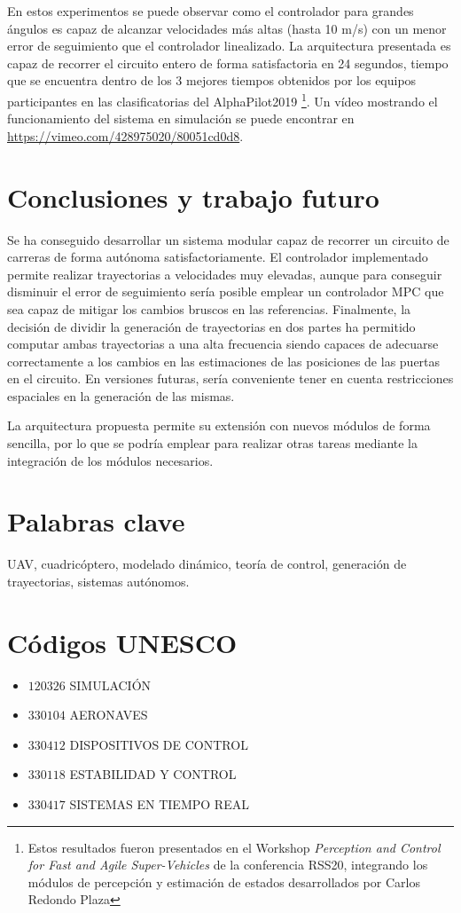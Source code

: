 En estos experimentos se puede observar como el controlador para grandes ángulos es capaz de alcanzar velocidades más altas (hasta 10 m/s) con un menor error de seguimiento que el controlador linealizado. La arquitectura presentada es capaz de recorrer el circuito entero de forma satisfactoria en 24 segundos, tiempo que se encuentra dentro de los 3 mejores tiempos obtenidos por los equipos participantes en las clasificatorias del AlphaPilot2019 \cite{guerra2019flightgoggles} \footnote{Estos resultados fueron presentados en el Workshop  \textit{Perception and Control for Fast and Agile Super-Vehicles} de la conferencia RSS20, integrando los módulos de percepción y estimación de estados desarrollados por Carlos Redondo Plaza}. Un vídeo mostrando el funcionamiento del sistema en simulación se puede encontrar en \url{https://vimeo.com/428975020/80051cd0d8}.


\section*{Conclusiones y trabajo futuro}

Se ha conseguido desarrollar un sistema modular capaz de recorrer un circuito de carreras de forma autónoma satisfactoriamente. El controlador implementado permite realizar trayectorias a velocidades muy elevadas, aunque para conseguir disminuir el error de seguimiento sería posible emplear un controlador MPC que sea capaz de mitigar los cambios bruscos en las referencias. Finalmente, la decisión de dividir la generación de trayectorias en dos partes ha permitido computar ambas trayectorias a una alta frecuencia siendo capaces de adecuarse correctamente a los cambios en las estimaciones de las posiciones de las puertas en el circuito. En versiones futuras, sería conveniente tener en cuenta restricciones espaciales en la generación de las mismas.

La arquitectura propuesta permite su extensión con nuevos módulos de forma sencilla, por lo que se podría emplear para realizar otras tareas mediante la integración de los módulos necesarios.

\newpage
\section*{Palabras clave}
UAV, cuadricóptero, modelado dinámico, teoría de control, generación de trayectorias, sistemas autónomos.

\section*{Códigos UNESCO}
\begin{itemize}
	\item[] $120326$ \quad SIMULACIÓN
	\item[] $330104$ \quad AERONAVES
	\item[] $330412$ \quad DISPOSITIVOS DE CONTROL
	\item[]	$330118$ \quad ESTABILIDAD Y CONTROL
	\item[] $330417$ \quad SISTEMAS EN TIEMPO REAL 
		

\end{itemize}
\newpage
\cleardoublepage